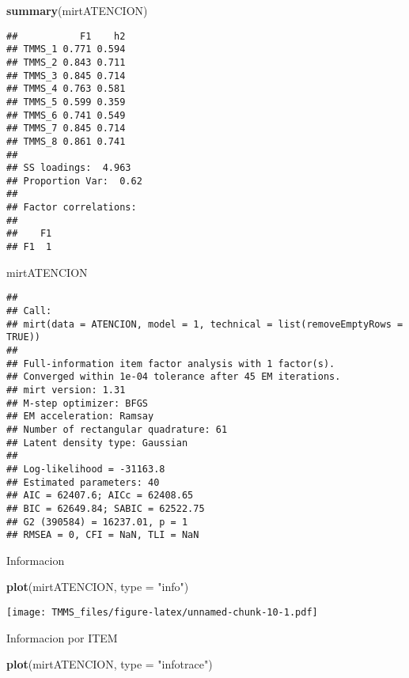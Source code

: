 \documentclass[
  10pt,
  spanish,
]{article}
\newenvironment{Shaded}{\begin{snugshade}}{\end{snugshade}}
\newcommand{\DataTypeTok}[1]{\textcolor[rgb]{0.13,0.29,0.53}{#1}}
\newcommand{\KeywordTok}[1]{\textcolor[rgb]{0.13,0.29,0.53}{\textbf{#1}}}
\newcommand{\NormalTok}[1]{#1}
\newcommand{\StringTok}[1]{\textcolor[rgb]{0.31,0.60,0.02}{#1}}
\begin{document}
\begin{Shaded}
\begin{Highlighting}[]
\KeywordTok{summary}\NormalTok{(mirtATENCION)}
\end{Highlighting}
\end{Shaded}

\begin{verbatim}
##           F1    h2
## TMMS_1 0.771 0.594
## TMMS_2 0.843 0.711
## TMMS_3 0.845 0.714
## TMMS_4 0.763 0.581
## TMMS_5 0.599 0.359
## TMMS_6 0.741 0.549
## TMMS_7 0.845 0.714
## TMMS_8 0.861 0.741
## 
## SS loadings:  4.963 
## Proportion Var:  0.62 
## 
## Factor correlations: 
## 
##    F1
## F1  1
\end{verbatim}

\begin{Shaded}
\begin{Highlighting}[]
\NormalTok{mirtATENCION}
\end{Highlighting}
\end{Shaded}

\begin{verbatim}
## 
## Call:
## mirt(data = ATENCION, model = 1, technical = list(removeEmptyRows = TRUE))
## 
## Full-information item factor analysis with 1 factor(s).
## Converged within 1e-04 tolerance after 45 EM iterations.
## mirt version: 1.31 
## M-step optimizer: BFGS 
## EM acceleration: Ramsay 
## Number of rectangular quadrature: 61
## Latent density type: Gaussian 
## 
## Log-likelihood = -31163.8
## Estimated parameters: 40 
## AIC = 62407.6; AICc = 62408.65
## BIC = 62649.84; SABIC = 62522.75
## G2 (390584) = 16237.01, p = 1
## RMSEA = 0, CFI = NaN, TLI = NaN
\end{verbatim}

Informacion

\begin{Shaded}
\begin{Highlighting}[]
\KeywordTok{plot}\NormalTok{(mirtATENCION, }\DataTypeTok{type =} \StringTok{"info"}\NormalTok{)}
\end{Highlighting}
\end{Shaded}

\texttt{[image: TMMS\_files/figure-latex/unnamed-chunk-10-1.pdf]}

Informacion por ITEM

\begin{Shaded}
\begin{Highlighting}[]
\KeywordTok{plot}\NormalTok{(mirtATENCION, }\DataTypeTok{type =} \StringTok{"infotrace"}\NormalTok{)}
\end{Highlighting}
\end{Shaded}
\end{document}
